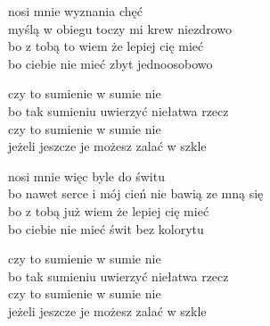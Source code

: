 \begin{text}
    nosi mnie wyznania chęć\\
    myślą w obiegu toczy mi krew niezdrowo\\
    bo z tobą to wiem że lepiej cię mieć\\
    bo ciebie nie mieć zbyt jednoosobowo

    czy to sumienie w sumie nie\\
    bo tak sumieniu uwierzyć niełatwa rzecz\\
    czy to sumienie w sumie nie\\
    jeżeli jeszcze je możesz zalać w szkle

    nosi mnie więc byle do świtu\\
    bo nawet serce i mój cień nie bawią ze mną się\\
    bo z tobą już wiem że lepiej cię mieć\\
    bo ciebie nie mieć świt bez kolorytu

    czy to sumienie w sumie nie\\
    bo tak sumieniu uwierzyć niełatwa rzecz\\
    czy to sumienie w sumie nie\\
    jeżeli jeszcze je możesz zalać w szkle
\end{text}
\begin{chord}

\end{chord}